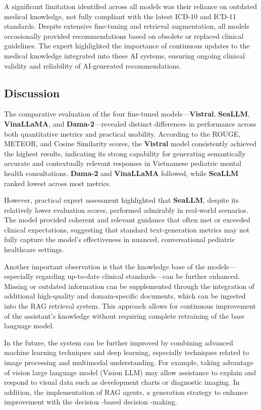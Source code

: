 \documentclass[conference]{IEEEtran}
\begin{document}
A significant limitation identified across all models was their reliance on outdated medical knowledge, not fully compliant with the latest ICD-10 and ICD-11 standards. Despite extensive fine-tuning and retrieval augmentation, all models occasionally provided recommendations based on obsolete or replaced clinical guidelines. The expert highlighted the importance of continuous updates to the medical knowledge integrated into these AI systems, ensuring ongoing clinical validity and reliability of AI-generated recommendations.

\subsection{Discussion}

The comparative evaluation of the four fine-tuned models—\textbf{Vistral}, \textbf{SeaLLM}, \textbf{VinaLLaMA}, and \textbf{Dama-2}—revealed distinct differences in performance across both quantitative metrics and practical usability. According to the ROUGE, METEOR, and Cosine Similarity scores, the \textbf{Vistral} model consistently achieved the highest results, indicating its strong capability for generating semantically accurate and contextually relevant responses in Vietnamese pediatric mental health consultations. \textbf{Dama-2} and \textbf{VinaLLaMA} followed, while \textbf{SeaLLM} ranked lowest across most metrics.

However, practical expert assessment highlighted that \textbf{SeaLLM}, despite its relatively lower evaluation scores, performed admirably in real-world scenarios. The model provided coherent and relevant guidance that often met or exceeded clinical expectations, suggesting that standard text-generation metrics may not fully capture the model's effectiveness in nuanced, conversational pediatric healthcare settings.

Another important observation is that the knowledge base of the models—especially regarding up-to-date clinical standards—can be further enhanced. Missing or outdated information can be supplemented through the integration of additional high-quality and domain-specific documents, which can be ingested into the RAG retrieval system. This approach allows for continuous improvement of the assistant's knowledge without requiring complete retraining of the base language model.

In the future, the system can be further improved by combining advanced machine learning techniques and deep learning, especially techniques related to image processing and multimodal understanding. For example, taking advantage of vision large language model (Vision LLM) may allow assistance to explain and respond to visual data such as development charts or diagnostic imaging. In addition, the implementation of RAG agents, a generation strategy to enhance improvement with the decision -based decision -making.
\end{document}
